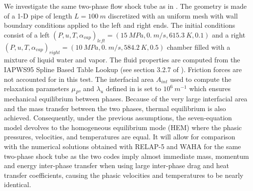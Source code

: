\documentclass{inputs/mc2015}
\begin{document}
We investigate the same two-phase flow shock tube as in \cite{Sokolowski-Koszela, waha-manual}. The geometry is made of a 1-D pipe of length $L = 100\ m$ discretized with an uniform mesh with wall boundary conditions applied to the left and right ends. The initial conditions consist of a left $(P, u, T, \alpha_{vap})_{left} = (15 \ MPa, 0. \ m/s, 615.3 \ K, 0.1)$ and a right $(P, u, T, \alpha_{vap})_{right} = (10 \ MPa, 0. \ m/s, 584.2 \ K, 0.5)$ chamber filled with a mixture of liquid water and vapor. The fluid properties are computed from the IAPWS95 Spline Based Table Lookup (see section 3.2.7 of \cite{Berry_Peterson_2014}). Friction forces are not accounted for in this test. The interfacial area $A_{int}$ used to compute the relaxation parameters $\mu_P$, and $\lambda_u$ defined in  is set to $10^6 \ m^{-1}$ which ensures mechanical equilibrium between phases. Because of the very large interfacial area and the mass transfer between the two phases, thermal equilibrium is also achieved. Consequently, under the previous assumptions, the seven-equation model devolves to the homogeneous equilibrium mode (HEM) where the phasic pressures, velocities, and temperatures are equal. It will allow for comparison with the numerical solutions obtained with RELAP-5 \cite{Sokolowski-Koszela} and WAHA \cite{waha-manual} for the same two-phase shock tube as the two codes imply almost immediate mass, momentum and energy inter-phase transfer when using large inter-phase drag and heat transfer coefficients, causing the phasic velocities and temperatures to be nearly identical. 
\end{document}
